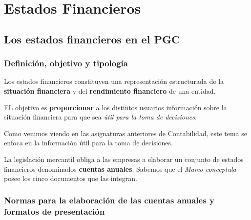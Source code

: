 \documentclass[
  paper=a4,
  ,captions=tableheading
]{scrbook}
\begin{document}
\hypertarget{estados-financieros}{%
\chapter{Estados Financieros}\label{estados-financieros}}

\hypertarget{los-estados-financieros-en-el-pgc}{%
\section{Los estados financieros en el
PGC}\label{los-estados-financieros-en-el-pgc}}

\hypertarget{definiciuxf3n-objetivo-y-tipologuxeda}{%
\subsection{Definición, objetivo y
tipología}\label{definiciuxf3n-objetivo-y-tipologuxeda}}

Los estados financieros constituyen una representación estructurada de
la \textbf{situación financiera} y del \textbf{rendimiento financiero}
de una entidad.

EL objetivo es \textbf{proporcionar} a los distintos usuarios
información sobre la situación financiera para que sea \emph{útil para
la toma de decisiones}.

Como venimos viendo en las asignaturas anteriores de Contabilidad, este
tema se enfoca en la información útil para la toma de decisiones.

La legislación mercantil obliga a las empresas a elaborar un conjunto de
estados financieros denominados \textbf{cuentas anuales}. Sabemos que el
\emph{Marco conceptula} posee los cinco documentos que las integran.

\hypertarget{normas-para-la-elaboraciuxf3n-de-las-cuentas-anuales-y-formatos-de-presentaciuxf3n}{%
\subsection{Normas para la elaboración de las cuentas anuales y formatos
de
presentación}\label{normas-para-la-elaboraciuxf3n-de-las-cuentas-anuales-y-formatos-de-presentaciuxf3n}}
\end{document}
